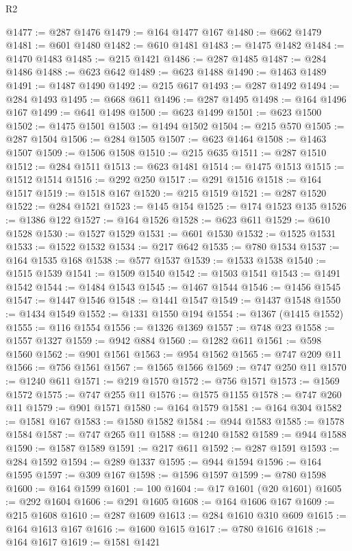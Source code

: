 \begin{lexlean}{R2}
\begin{coremodule}
@1477 := @287 @1476
@1479 := @164 @1477 @167
@1480 := @662 @1479
@1481 := @601 @1480
@1482 := @610 @1481
@1483 := @1475 @1482
@1484 := @1470 @1483
@1485 := @215 @1421
@1486 := @287 @1485
@1487 := @284 @1486
@1488 := @623 @642
@1489 := @623 @1488
@1490 := @1463 @1489
@1491 := @1487 @1490
@1492 := @215 @617
@1493 := @287 @1492
@1494 := @284 @1493
@1495 := @668 @611
@1496 := @287 @1495
@1498 := @164 @1496 @167
@1499 := @641 @1498
@1500 := @623 @1499
@1501 := @623 @1500
@1502 := @1475 @1501
@1503 := @1494 @1502
@1504 := @215 @570
@1505 := @287 @1504
@1506 := @284 @1505
@1507 := @623 @1464
@1508 := @1463 @1507
@1509 := @1506 @1508
@1510 := @215 @635
@1511 := @287 @1510
@1512 := @284 @1511
@1513 := @623 @1481
@1514 := @1475 @1513
@1515 := @1512 @1514
@1516 := @292 @250
@1517 := @291 @1516
@1518 := @164 @1517
@1519 := @1518 @167
@1520 := @215 @1519
@1521 := @287 @1520
@1522 := @284 @1521
@1523 := @145 @154
@1525 := @174 @1523 @135
@1526 := @1386 @122
@1527 := @164 @1526
@1528 := @623 @611
@1529 := @610 @1528
@1530 := @1527 @1529
@1531 := @601 @1530
@1532 := @1525 @1531
@1533 := @1522 @1532
@1534 := @217 @642
@1535 := @780 @1534
@1537 := @164 @1535 @168
@1538 := @577 @1537
@1539 := @1533 @1538
@1540 := @1515 @1539
@1541 := @1509 @1540
@1542 := @1503 @1541
@1543 := @1491 @1542
@1544 := @1484 @1543
@1545 := @1467 @1544
@1546 := @1456 @1545
@1547 := @1447 @1546
@1548 := @1441 @1547
@1549 := @1437 @1548
@1550 := @1434 @1549
@1552 := @1331 @1550 @194
@1554 := @1367 (@1415 @1552)
@1555 := @116 @1554
@1556 := @1326 @1369
@1557 := @748 @23
@1558 := @1557 @1327
@1559 := @942 @884
@1560 := @1282 @611
@1561 := @598 @1560
@1562 := @901 @1561
@1563 := @954 @1562
@1565 := @747 @209 @11
@1566 := @756 @1561
@1567 := @1565 @1566
@1569 := @747 @250 @11
@1570 := @1240 @611
@1571 := @219 @1570
@1572 := @756 @1571
@1573 := @1569 @1572
@1575 := @747 @255 @11
@1576 := @1575 @1155
@1578 := @747 @260 @11
@1579 := @901 @1571
@1580 := @164 @1579
@1581 := @164 @304
@1582 := @1581 @167
@1583 := @1580 @1582
@1584 := @944 @1583
@1585 := @1578 @1584
@1587 := @747 @265 @11
@1588 := @1240 @1582
@1589 := @944 @1588
@1590 := @1587 @1589
@1591 := @217 @611
@1592 := @287 @1591
@1593 := @284 @1592
@1594 := @289 @1337
@1595 := @944 @1594
@1596 := @164 @1595
@1597 := @309 @167
@1598 := @1596 @1597
@1599 := @780 @1598
@1600 := @164 @1599
@1601 := 100
@1604 := @17 @1601 (@20 @1601)
@1605 := @292 @1604
@1606 := @291 @1605
@1608 := @164 @1606 @167
@1609 := @215 @1608
@1610 := @287 @1609
@1613 := @284 @1610 @310 @609
@1615 := @164 @1613 @167
@1616 := @1600 @1615
@1617 := @780 @1616
@1618 := @164 @1617
@1619 := @1581 @1421

\end{coremodule}
\end{lexlean}
